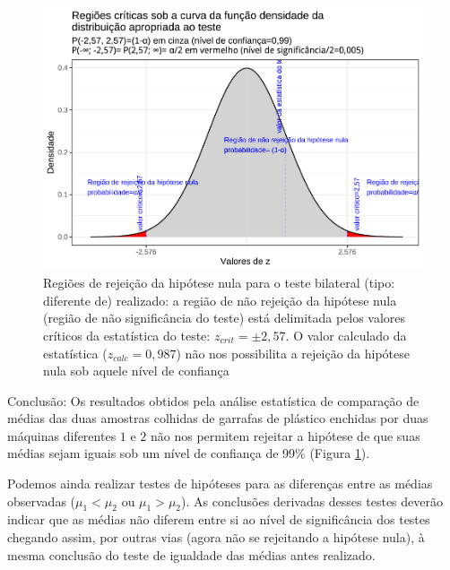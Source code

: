 \documentclass[
]{book}
\begin{document}
\begin{figure}

{\centering \includegraphics[width=1\linewidth]{apostila_files/figure-latex/fig83-1} 

}

\caption{Regiões de rejeição da hipótese nula para o teste bilateral (tipo: diferente de) realizado: a região de não rejeição da hipótese nula (região de não significância do teste) está delimitada pelos valores críticos da estatística do teste: $z_{crit} =\pm 2,57$. O valor calculado da estatística ($z_{calc}=0,987$) não nos possibilita a rejeição da hipótese nula sob aquele nível de confiança}\label{fig:fig83}
\end{figure}

\hfill\break

Conclusão: Os resultados obtidos pela análise estatística de comparação de médias das duas amostras colhidas de garrafas de plástico enchidas por duas máquinas diferentes \(1\) e \(2\) não nos permitem rejeitar a hipótese de que suas médias sejam iguais sob um nível de confiança de 99\% (Figura \ref{fig:fig83}).

\hfill\break

Podemos ainda realizar testes de hipóteses para as diferenças entre as médias observadas (\(\mu_{1}<\mu_{2}\) ou \(\mu_{1}>\mu_{2}\)). As conclusões derivadas desses testes deverão indicar que as médias não diferem entre si ao nível de significância dos testes chegando assim, por outras vias (agora não se rejeitando a hipótese nula), à mesma conclusão do teste de igualdade das médias antes realizado.

\hfill\break
\end{document}
